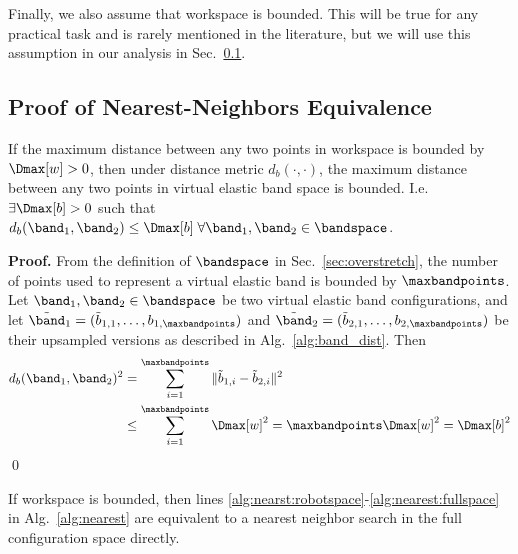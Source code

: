 Finally, we also assume that workspace is bounded. This will be true for any practical task and is rarely mentioned in the literature, but we will use this assumption in our analysis in Sec.~\ref{sec:nn_equiv}.




\subsection{Proof of Nearest-Neighbors Equivalence}
\label{sec:nn_equiv}


\begin{lemma}
    \label{lem:banddist}
     If the maximum distance between any two points in workspace is bounded by $\Dmax[w] > 0$, then under distance metric $d_b(\cdot, \cdot)$, the maximum distance between any two points in virtual elastic band space is bounded. I.e. $\exists \Dmax[b] > 0$ such that $d_b(\band_1, \band_2) \leq \Dmax[b] \; \forall \band_1, \band_2 \in \bandspace$.
\end{lemma}


\noindent
{\bf Proof.}
From the definition of $\bandspace$ in Sec.~\ref{sec:overstretch}, the number of points used to represent a virtual elastic band is bounded by $\maxbandpoints$. Let $\band_1, \band_2 \in \bandspace$ be two virtual elastic band configurations, and let $\tilde \band_1 = (\tilde b_{1,1}, \dots, b_{1,\maxbandpoints})$ and $\tilde \band_2 = (\tilde b_{2,1}, \dots, b_{2,\maxbandpoints})$ be their upsampled versions as described in Alg.~\ref{alg:band_dist}. Then
\begin{equation}
\begin{split}
    d_b(\band_1, \band_2)^2 &= \sum_{i=1}^{\maxbandpoints} \| \tilde b_{1,i} - \tilde b_{2,i} \|^2 \\
                            &\leq \sum_{i=1}^{\maxbandpoints} \Dmax[w]^2 = \maxbandpoints \Dmax[w]^2 = \Dmax[b]^2
\end{split}
\end{equation}
\qed




\begin{lemma}
    If workspace is bounded, then lines \ref{alg:nearst:robotspace}-\ref{alg:nearest:fullspace} in Alg.~\ref{alg:nearest} are equivalent to a nearest neighbor search in the full configuration space directly.
\end{lemma}


